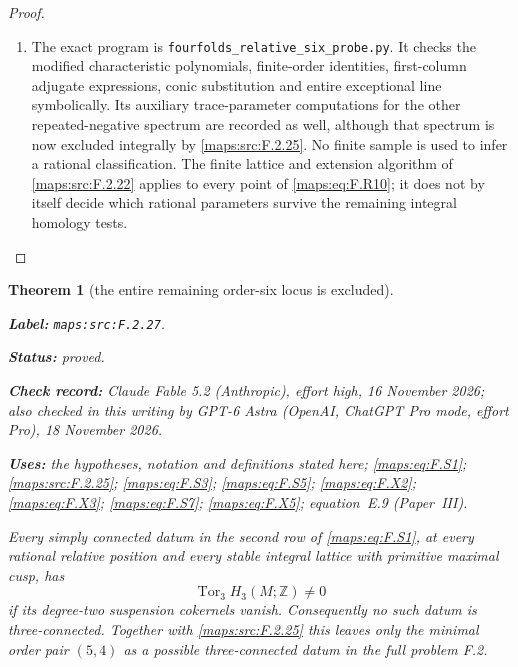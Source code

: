 \documentclass[11pt,a4paper]{article}
\newtheorem{theorem}{Theorem}[section]
\theoremstyle{definition}
\newcommand{\StatementRecord}[4]{\par\smallskip\begingroup\upshape\raggedright\noindent\textbf{Label:} \nolinkurl{#1}.\par\noindent\textbf{Status:} #2.\par\noindent\textbf{Check record:} #3.\par\noindent\textbf{Uses:} #4.\par\endgroup\smallskip}
\newcommand{\CurrentChecker}{GPT-6 Astra (OpenAI, ChatGPT Pro mode, effort Pro), 18 November 2026}
\newcommand{\ExternalPaperRef}[3]{\ifmmode\text{\upshape #1#2 (Paper~#3)}\else #1#2 (Paper~#3)\fi}
\begin{document}
\begin{proof}
\begin{enumerate}[label=\arabic*.]
\item The exact program is
\texttt{fourfolds\_relative\_six\_probe.py}.
It checks the modified characteristic polynomials, finite-order
identities, first-column adjugate expressions, conic
substitution and entire exceptional line symbolically.
Its auxiliary trace-parameter computations for the other
repeated-negative spectrum are recorded as well, although
that spectrum is now excluded integrally by \ref{maps:src:F.2.25}.
No finite sample is used to infer a rational classification.
The finite lattice and extension algorithm of \ref{maps:src:F.2.22} applies
to every point of \eqref{maps:eq:F.R10}; it does not by itself decide
which rational parameters survive the remaining integral
homology tests.

\end{enumerate}
\end{proof}




\begin{theorem}[the entire remaining order-six locus is excluded]\label{maps:src:F.2.27}
\StatementRecord{maps:src:F.2.27}{proved}{Claude Fable 5.2 (Anthropic), effort high, 16 November 2026; also checked in this writing by \CurrentChecker}{the hypotheses, notation and definitions stated here; \cref{maps:eq:F.S1}; \cref{maps:src:F.2.25}; \cref{maps:eq:F.S3}; \cref{maps:eq:F.S5}; \cref{maps:eq:F.X2}; \cref{maps:eq:F.X3}; \cref{maps:eq:F.S7}; \cref{maps:eq:F.X5}; \ExternalPaperRef{equation~}{{E.9}}{III}}


Every simply connected datum in the second row of \eqref{maps:eq:F.S1},
at every rational relative position and every stable integral
lattice with primitive maximal cusp, has
\[
                 \operatorname{Tor}_3 H_3(M;\mathbb Z)\ne0
\]
if its degree-two suspension cokernels vanish.
Consequently no such datum is three-connected.  Together with
\ref{maps:src:F.2.25} this leaves only the minimal order pair $(5,4)$ as a
possible three-connected datum in the full problem F.2.
\end{theorem}
\end{document}
